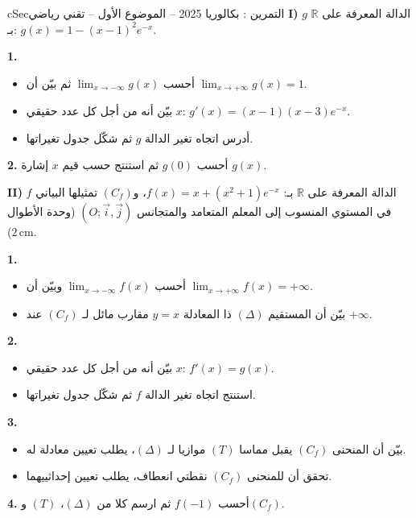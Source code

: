 \documentclass[12pt,a4paper]{article}
\newenvironment{BOX}[2]{\begin{otherlanguage}{english}\begin{arbox}{#1}{#2}}{\end{arbox}\end{otherlanguage}}
\newcounter{exo}
\newenvironment{tamrin}[1]{\stepcounter{exo}\begin{BOX}{cSec}{التمرين \theexo: #1}}{\end{BOX}}
\newcommand{\R}{\mathbb{R}}
\newenvironment{sq}{\begin{itemize}[leftmargin=2.4em,itemsep=3pt]}{\end{itemize}}
\newcommand{\qa}{\item[(أ)]}\newcommand{\qb}{\item[(ب)]}\newcommand{\qc}{\item[(جـ)]}\newcommand{\qd}{\item[(د)]}\newcommand{\qe}{\item[(هـ)]}
\newcommand{\QQ}[1]{\par\smallskip\textbf{#1.} }
\begin{document}
\begin{tamrin}{بكالوريا 2025 -- الموضوع الأول -- تقني رياضي}
\textbf{I)} $g$ الدالة المعرفة على $\R$ بـ: $g(x)=1-(x-1)^2e^{-x}$.
\QQ{1}
\begin{sq}
\qa أحسب $\displaystyle\lim_{x\to-\infty}g(x)$ ثم بيّن أن $\displaystyle\lim_{x\to+\infty}g(x)=1$.
\qb بيّن أنه من أجل كل عدد حقيقي $x$: $g'(x)=(x-1)(x-3)e^{-x}$.
\qc أدرس اتجاه تغير الدالة $g$ ثم شكّل جدول تغيراتها.
\end{sq}
\QQ{2} أحسب $g(0)$ ثم استنتج حسب قيم $x$ إشارة $g(x)$.

\textbf{II)} $f$ الدالة المعرفة على $\R$ بـ: $f(x)=x+\left(x^2+1\right)e^{-x}$، و$(C_f)$ تمثيلها البياني في المستوي المنسوب إلى المعلم المتعامد والمتجانس $(O;\vec{i},\vec{j})$ (وحدة الأطوال $2\,\text{cm}$).
\QQ{1}
\begin{sq}
\qa أحسب $\displaystyle\lim_{x\to-\infty}f(x)$ وبيّن أن $\displaystyle\lim_{x\to+\infty}f(x)=+\infty$.
\qb بيّن أن المستقيم $(\Delta)$ ذا المعادلة $y=x$ مقارب مائل لـ $(C_f)$ عند $+\infty$.
\end{sq}
\QQ{2}
\begin{sq}
\qa بيّن أنه من أجل كل عدد حقيقي $x$: $f'(x)=g(x)$.
\qb استنتج اتجاه تغير الدالة $f$ ثم شكّل جدول تغيراتها.
\end{sq}
\QQ{3}
\begin{sq}
\qa بيّن أن المنحنى $(C_f)$ يقبل مماسا $(T)$ موازيا لـ $(\Delta)$، يطلب تعيين معادلة له.
\qb تحقق أن للمنحنى $(C_f)$ نقطتي انعطاف، يطلب تعيين إحداثييهما.
\end{sq}
\QQ{4} أحسب $f(-1)$ ثم ارسم كلا من $(\Delta)$، $(T)$ و$(C_f)$.
\end{tamrin}
\end{document}
